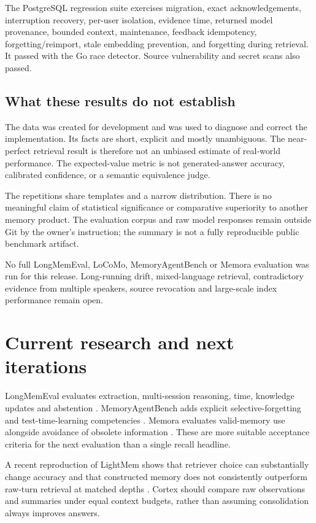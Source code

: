 \documentclass[11pt]{article}
\begin{document}
The PostgreSQL regression suite exercises migration, exact acknowledgements, interruption recovery, per-user isolation, evidence time, returned model provenance, bounded context, maintenance, feedback idempotency, forgetting/reimport, stale embedding prevention, and forgetting during retrieval. It passed with the Go race detector. Source vulnerability and secret scans also passed.

\subsection{What these results do not establish}
The data was created for development and was used to diagnose and correct the implementation. Its facts are short, explicit and mostly unambiguous. The near-perfect retrieval result is therefore not an unbiased estimate of real-world performance. The expected-value metric is not generated-answer accuracy, calibrated confidence, or a semantic equivalence judge.

The repetitions share templates and a narrow distribution. There is no meaningful claim of statistical significance or comparative superiority to another memory product. The evaluation corpus and raw model responses remain outside Git by the owner's instruction; the summary is not a fully reproducible public benchmark artifact.

No full LongMemEval, LoCoMo, MemoryAgentBench or Memora evaluation was run for this release. Long-running drift, mixed-language retrieval, contradictory evidence from multiple speakers, source revocation and large-scale index performance remain open.

\section{Current research and next iterations}
LongMemEval evaluates extraction, multi-session reasoning, time, knowledge updates and abstention \cite{longmem}. MemoryAgentBench adds explicit selective-forgetting and test-time-learning competencies \cite{mab}. Memora evaluates valid-memory use alongside avoidance of obsolete information \cite{memora}. These are more suitable acceptance criteria for the next evaluation than a single recall headline.

A recent reproduction of LightMem shows that retriever choice can substantially change accuracy and that constructed memory does not consistently outperform raw-turn retrieval at matched depths \cite{lightrepro}. Cortex should compare raw observations and summaries under equal context budgets, rather than assuming consolidation always improves answers.
\end{document}
